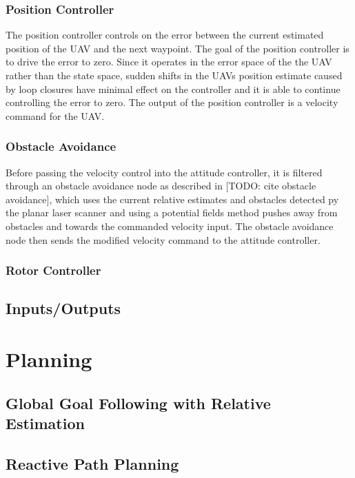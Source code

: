\documentclass[letterpaper, 10 pt, conference]{ieeeconf}  %
\newcommand{\todo}[1]{{\color{blue}[TODO: #1]}}
\begin{document}
\subsubsection{Position Controller}

The position controller controls on the error between the current estimated position of the UAV and the next waypoint. The goal of the position controller is to drive the error to zero. Since it operates in the error space of the the UAV rather than the state space, sudden shifts in the UAVs position estimate caused by loop closures have minimal effect on the controller and it is able to continue controlling the error to zero. The output of the position controller is a velocity command for the UAV.

\subsubsection{Obstacle Avoidance}

Before passing the velocity control into the attitude controller, it is filtered through an obstacle avoidance node as described in \todo{cite obstacle avoidance}, which uses the current relative estimates and obstacles detected py the planar laser scanner and using a potential fields method pushes away from obstacles and towards the commanded velocity input. The obstacle avoidance node then sends the modified velocity command to the attitude controller. 

\subsubsection{Rotor Controller}

\subsection{Inputs/Outputs}


\section{Planning}\label{planning}

\subsection{Global Goal Following with Relative Estimation}

\subsection{Reactive Path Planning}
\end{document}
